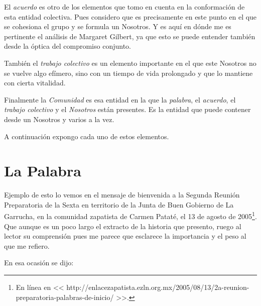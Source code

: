 \documentclass[oneside]{book}
\begin{document}
El \textit{acuerdo} es otro de los elementos que tomo en cuenta en la conformación de esta entidad colectiva. Pues considero que es precisamente en este punto en el que se cohesiona el grupo y se formula un Nosotros. Y es aquí en dónde me es pertinente el análisis de Margaret Gilbert, ya que esto se puede entender también desde la óptica del compromiso conjunto.    

También el \textit{trabajo colectivo} es un elemento importante en el que este Nosotros no se vuelve algo efímero, sino con un tiempo de vida prolongado y que lo mantiene con cierta vitalidad.

Finalmente la \textit{Comunidad} es esa entidad en la que la \textit{palabra}, el \textit{acuerdo}, el \textit{trabajo colectivo} y el \textit{Nosotros} están presentes. Es la entidad que puede contener desde un Nosotros y varios a la vez.

A continuación expongo cada uno de estos elementos. 

\section{La Palabra}

Ejemplo de esto lo vemos en el mensaje de bienvenida a la Segunda Reunión Preparatoria de la Sexta en territorio de la Junta de Buen Gobierno de La Garrucha, en la comunidad zapatista de Carmen Pataté, el 13 de agosto de 2005\footnote{En línea en << http://enlacezapatista.ezln.org.mx/2005/08/13/2a-reunion-preparatoria-palabras-de-inicio/ >>.}. Que aunque es un poco largo el extracto de la historia que presento, ruego al lector su comprensión pues me parece que esclarece la importancia y el peso al que me refiero. 

En esa ocasión se dijo:
\end{document}
